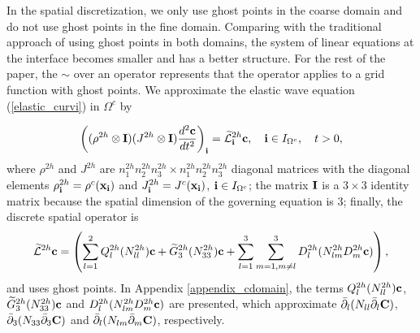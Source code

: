 In the spatial discretization, we only use ghost points in the coarse domain and do not use ghost points in the fine domain. Comparing with the traditional approach of using ghost points in both domains, the system of linear equations at the interface becomes smaller and has a better structure. For the rest of the paper, the $\sim$ over an operator represents that the operator applies to a grid function with ghost points. We approximate the elastic wave equation (\ref{elastic_curvi}) in $\Omega^c$ by
{%
\begin{equation}\label{elastic_semi_c}
\left(({\rho}^{2h}\otimes{\bf I})(J^{2h}\otimes {\bf I})\frac{d^2{{\bf c}}}{dt^2}\right)_{\bf i} = \wt{\mathcal{L}}^{2h}_{\bf i} {{\bf c}},\quad {\bf i}\in I_{\Omega^c},\quad t>0,
\end{equation}
where $\rho^{2h}$ and $J^{2h}$ are $n_1^{2h}n_2^{2h}n_3^{2h}\times n_1^{2h}n_2^{2h}n_3^{2h}$ diagonal matrices with the diagonal elements $\rho^{2h}_{\bf i} = \rho^c({\bf x}_{\bf i})$ and $J^{2h}_{\bf i} = J^c({\bf x}_{\bf i})$, ${\bf i}\in I_{\Omega^c}$; the matrix ${\bf I}$ is a $3\times 3$ identity matrix because the spatial dimension of the governing equation is $3$; finally, the discrete spatial operator is
\begin{equation}\label{L_operator}
\wt{\mathcal{L}}^{2h} {{\bf c}} = \left(\sum_{l=1}^2{Q}_l^{2h}({N}_{ll}^{2h}){\bf c}+\wt{{G}}_3^{2h}({N}_{33}^{2h}){{\bf c}}+\sum_{l=1}^3\sum_{m=1,m\neq l}^3{D}_l^{2h}({N}_{lm}^{2h}{D}_m^{2h}{\bf c})\right),
\end{equation}
and uses ghost points. %
In Appendix \ref{appendix_cdomain}, the terms $Q_l^{2h}(N_{ll}^{2h}){\bf c}$, $\widetilde{G}_3^{2h}(N_{33}^{2h}){\bf c}$ and $D_{l}^{2h}(N_{lm}^{2h}D_m^{2h}{\bf c})$ are presented, which approximate $\bar{\partial}_l(N_{ll}\bar{\partial}_l{\bf C})$, $\bar{\partial}_3(N_{33}\bar{\partial}_3 {\bf C})$ and $\bar{\partial}_l(N_{lm}\bar{\partial}_m {\bf C})$, respectively.

}

